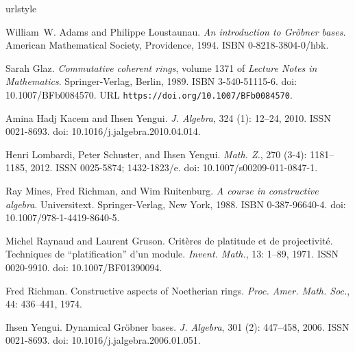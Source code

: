\small

%
\begin{thebibliography}{8}
\providecommand{\natexlab}[1]{#1}
\providecommand{\url}[1]{\texttt{#1}}
\expandafter\ifx\csname urlstyle\endcsname\relax
  \providecommand{\doi}[1]{doi: #1}\else
  \providecommand{\doi}{doi: \begingroup \urlstyle{rm}\Url}\fi

William~W. {Adams} and Philippe {Loustaunau}.
\newblock \emph{{An introduction to Gr\"obner bases.}}
\newblock American Mathematical Society, Providence, 1994.
\newblock ISBN 0-8218-3804-0/hbk.

Sarah Glaz.
\newblock \emph{Commutative coherent rings}, volume 1371 of \emph{Lecture Notes
  in Mathematics}.
\newblock Springer-Verlag, Berlin, 1989.
\newblock ISBN 3-540-51115-6.
\newblock \doi{10.1007/BFb0084570}.
\newblock URL \url{https://doi.org/10.1007/BFb0084570}.

Amina {Hadj Kacem} and Ihsen {Yengui}.
\newblock \emph{{J. Algebra}}, 324 (1): 12--24, 2010.
\newblock ISSN 0021-8693.
\newblock \doi{10.1016/j.jalgebra.2010.04.014}.

Henri {Lombardi}, Peter {Schuster}, and Ihsen {Yengui}.
\newblock \emph{{Math. Z.}}, 270 (3-4): 1181--1185, 2012.
\newblock ISSN 0025-5874; 1432-1823/e.
\newblock \doi{10.1007/s00209-011-0847-1}.

Ray Mines, Fred Richman, and Wim Ruitenburg.
\newblock \emph{A course in constructive algebra}.
\newblock Universitext. Springer-Verlag, New York, 1988.
\newblock ISBN 0-387-96640-4.
\newblock \doi{10.1007/978-1-4419-8640-5}.

Michel Raynaud and Laurent Gruson.
\newblock Crit\`eres de platitude et de projectivit\'{e}. {T}echniques de
  ``platification'' d'un module.
\newblock \emph{Invent. Math.}, 13: 1--89, 1971.
\newblock ISSN 0020-9910.
\newblock \doi{10.1007/BF01390094}.

Fred Richman.
\newblock Constructive aspects of {N}oetherian rings.
\newblock \emph{Proc. Amer. Math. Soc.}, 44: 436--441, 1974.

Ihsen Yengui.
\newblock Dynamical {G}r\"obner bases.
\newblock \emph{J. Algebra}, 301 (2): 447--458, 2006.
\newblock ISSN 0021-8693.
\newblock \doi{10.1016/j.jalgebra.2006.01.051}.

\end{thebibliography}

\normalsize

\endgroup
\stopcontents[english]



